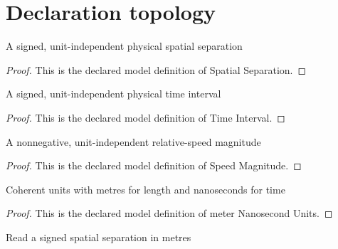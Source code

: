 \section{Declaration topology}
\begin{definition}
  \label{def:physics:phyx-mini-0592:phyxminiproblems-problemphyxmini0592-spatialseparation}
  A signed, unit-independent physical spatial separation
\end{definition}
\begin{proof}
  This is the declared model definition of Spatial Separation.
\end{proof}
\begin{definition}
  \label{def:physics:phyx-mini-0592:phyxminiproblems-problemphyxmini0592-timeinterval}
  A signed, unit-independent physical time interval
\end{definition}
\begin{proof}
  This is the declared model definition of Time Interval.
\end{proof}
\begin{definition}
  \label{def:physics:phyx-mini-0592:phyxminiproblems-problemphyxmini0592-speedmagnitude}
  A nonnegative, unit-independent relative-speed magnitude
\end{definition}
\begin{proof}
  This is the declared model definition of Speed Magnitude.
\end{proof}
\begin{definition}
  \label{def:physics:phyx-mini-0592:phyxminiproblems-problemphyxmini0592-meternanosecondunits}
  Coherent units with metres for length and nanoseconds for time
\end{definition}
\begin{proof}
  This is the declared model definition of meter Nanosecond Units.
\end{proof}
\begin{definition}
  \label{def:physics:phyx-mini-0592:phyxminiproblems-problemphyxmini0592-separationinmeters}
  Read a signed spatial separation in metres
\end{definition}
